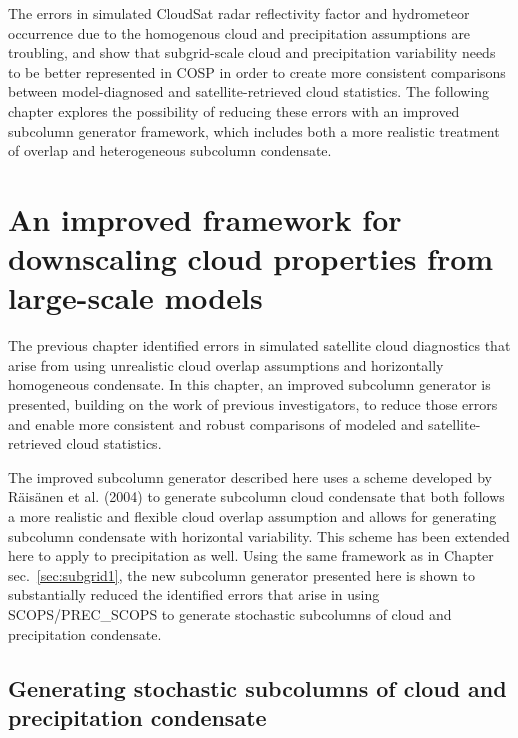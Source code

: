 The errors in simulated CloudSat radar reflectivity factor and
hydrometeor occurrence due to the homogenous cloud and precipitation
assumptions are troubling, and show that subgrid-scale cloud and
precipitation variability needs to be better represented in COSP in
order to create more consistent comparisons between model-diagnosed and
satellite-retrieved cloud statistics. The following chapter explores the
possibility of reducing these errors with an improved subcolumn
generator framework, which includes both a more realistic treatment of
overlap and heterogeneous subcolumn condensate.

\chapter{An improved framework for downscaling cloud properties from
large-scale models}\label{sec:subgrid2}

The previous chapter identified errors in simulated satellite cloud
diagnostics that arise from using unrealistic cloud overlap assumptions
and horizontally homogeneous condensate. In this chapter, an improved
subcolumn generator is presented, building on the work of previous
investigators, to reduce those errors and enable more consistent and
robust comparisons of modeled and satellite-retrieved cloud statistics.

The improved subcolumn generator described here uses a scheme developed
by Räisänen et al. (2004) to generate subcolumn cloud condensate that
both follows a more realistic and flexible cloud overlap assumption and
allows for generating subcolumn condensate with horizontal variability.
This scheme has been extended here to apply to precipitation as well.
Using the same framework as in Chapter sec.~\ref{sec:subgrid1}, the new
subcolumn generator presented here is shown to substantially reduced the
identified errors that arise in using SCOPS/PREC\_SCOPS to generate
stochastic subcolumns of cloud and precipitation condensate.

\section{Generating stochastic subcolumns of cloud and precipitation
condensate}\label{sec:subgrid2ux5fgenerator}

